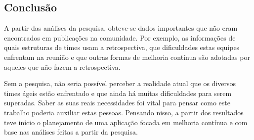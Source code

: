 \subsection{Conclusão}

A partir das análises da pesquisa, obteve-se dados importantes que não eram encontrados em publicações na comunidade. Por exemplo, as informações de quais estruturas de times usam a retrospectiva, que dificuldades estas equipes enfrentam na reunião e que outras formas de melhoria contínua são adotadas por aqueles que não fazem a retrospectiva.

Sem a pesquisa, não seria possível perceber a realidade atual que os diversos times ágeis estão enfrentado e que ainda há muitas dificuldades para serem superadas. Saber as suas reais necessidades foi vital para pensar como este trabalho poderia auxiliar estas pessoas. Pensando nisso, a partir dos resultados teve início o planejamento de uma aplicação focada em melhoria contínua e com base nas análises feitas a partir da pesquisa.